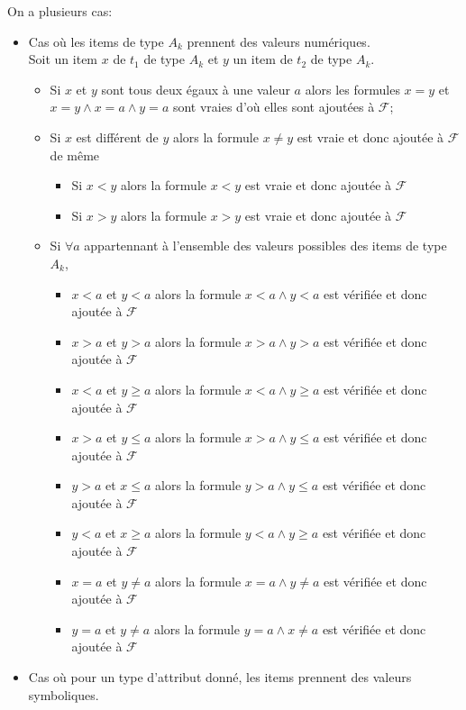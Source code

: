 \documentclass[a4paper,12pt,openany,oneside]{article}
\begin{document}
On a plusieurs cas:
\begin{itemize}
	
	\item Cas où les items de type $A_k$ prennent des valeurs numériques.\\ 
	Soit un item $x$ de $t_1$ de type $A_k$ et $y$ un item de $t_2$ de type $A_k$.
	
	\begin{itemize}
	
		\item Si $x$ et $y$ sont tous deux égaux à une valeur $a$ alors les formules $x=y$ et $x=y\wedge x=a\wedge y=a$ sont vraies d'où elles sont ajoutées à $\mathcal{F}$;
		\item Si $x$ est différent de $y$ alors la formule $x\neq y$ est vraie et donc ajoutée à $\mathcal{F}$ de même
		\begin{itemize}
			\item Si $x<y$ alors la formule $x<y$ est vraie et donc ajoutée à $\mathcal{F}$
			\item Si $x>y$ alors la formule $x>y$ est vraie et donc ajoutée à $\mathcal{F}$
	
		\end{itemize}
		\item Si $\forall a$ appartennant à l'ensemble des valeurs possibles des items de type $A_k$, 
		\begin{itemize}
			\item $x<a$ et $y<a$ alors la formule $x<a\wedge y<a$ est vérifiée et donc ajoutée à $\mathcal{F}$ 
			\item $x>a$ et $y>a$ alors la formule $x>a\wedge y>a$ est vérifiée et donc ajoutée à $\mathcal{F}$ 
			\item $x<a$ et $y\geq a$ alors la formule $x<a\wedge y\geq a$ est vérifiée et donc ajoutée à $\mathcal{F}$ 
			\item $x>a$ et $y\leq a$ alors la formule $x>a\wedge y\leq a$ est vérifiée et donc ajoutée à $\mathcal{F}$ 
			\item $y>a$ et $x\leq a$ alors la formule $y>a\wedge y\leq a$ est vérifiée et donc ajoutée à $\mathcal{F}$ 
			\item $y<a$ et $x\geq a$ alors la formule $y<a\wedge y\geq a$ est vérifiée et donc ajoutée à $\mathcal{F}$ 
			\item $x=a$ et $y\neq a$ alors la formule $x=a\wedge y\neq a$ est vérifiée et donc ajoutée à $\mathcal{F}$ 
			\item $y=a$ et $y\neq a$ alors la formule $y=a\wedge x\neq a$ est vérifiée et donc ajoutée à $\mathcal{F}$ 
		\end{itemize}
	\end{itemize}

	\item Cas où pour un type d'attribut donné, les items prennent des valeurs symboliques.\\ 

\end{itemize}
\end{document}
